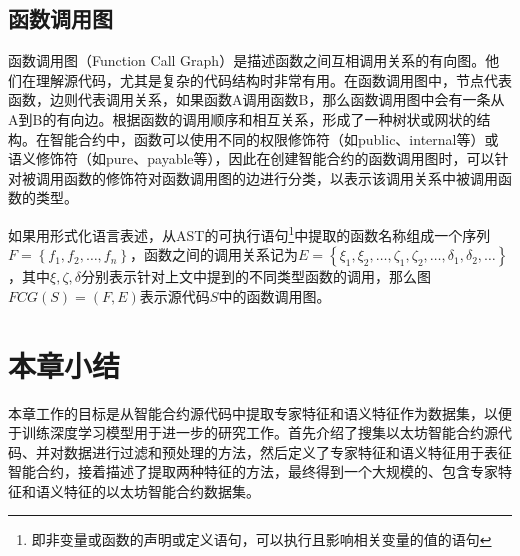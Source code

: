 \subsection{函数调用图}
\label{sec:函数调用图}
函数调用图（Function Call Graph）是描述函数之间互相调用关系的有向图。他们在理解源代码，尤其是复杂的代码结构时非常有用。在函数调用图中，节点代表函数，边则代表调用关系，如果函数A调用函数B，那么函数调用图中会有一条从A到B的有向边。根据函数的调用顺序和相互关系，形成了一种树状或网状的结构。在智能合约中，函数可以使用不同的权限修饰符（如public、internal等）或语义修饰符（如pure、payable等），因此在创建智能合约的函数调用图时，可以针对被调用函数的修饰符对函数调用图的边进行分类，以表示该调用关系中被调用函数的类型。

如果用形式化语言表述，从AST的可执行语句\footnote{即非变量或函数的声明或定义语句，可以执行且影响相关变量的值的语句}中提取的函数名称组成一个序列$F=\left\{f_1, f_2, \ldots, f_n\right\}$，函数之间的调用关系记为$E=\left\{\xi_1, \xi_2, \ldots, \zeta_1, \zeta_2, \ldots, \delta_1, \delta_2, \ldots\right\}$，其中$\xi, \zeta, \delta$分别表示针对上文中提到的不同类型函数的调用，那么图$FCG(S)=(F, E)$表示源代码$S$中的函数调用图。%


\section{本章小结}
\label{sec:本章小结3}
本章工作的目标是从智能合约源代码中提取专家特征和语义特征作为数据集，以便于训练深度学习模型用于进一步的研究工作。首先介绍了搜集以太坊智能合约源代码、并对数据进行过滤和预处理的方法，然后定义了专家特征和语义特征用于表征智能合约，接着描述了提取两种特征的方法，最终得到一个大规模的、包含专家特征和语义特征的以太坊智能合约数据集。